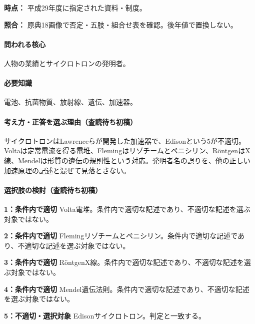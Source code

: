 \noindent\textbf{時点：} 平成29年度に指定された資料・制度。\par

\noindent\textbf{照合：} 原典18画像で否定・五肢・組合せ表を確認。後年値で置換しない。\par

\paragraph{問われる核心} 人物の業績とサイクロトロンの発明者。

\paragraph{必要知識} 電池、抗菌物質、放射線、遺伝、加速器。

\paragraph{考え方・正答を選ぶ理由（査読待ち初稿）} サイクロトロンはLawrenceらが開発した加速器で、Edisonという5が不適切。Voltaは定常電流を得る電堆、Flemingはリゾチームとペニシリン、RöntgenはX線、Mendelは形質の遺伝の規則性という対応。発明者名の誤りを、他の正しい加速原理の記述と混ぜて見落とさない。

\paragraph{選択肢の検討（査読待ち初稿）}\mbox{}\par

\noindent\textbf{1：条件内で適切} Volta電堆。条件内で適切な記述であり、不適切な記述を選ぶ対象ではない。\par

\noindent\textbf{2：条件内で適切} Flemingリゾチームとペニシリン。条件内で適切な記述であり、不適切な記述を選ぶ対象ではない。\par

\noindent\textbf{3：条件内で適切} RöntgenX線。条件内で適切な記述であり、不適切な記述を選ぶ対象ではない。\par

\noindent\textbf{4：条件内で適切} Mendel遺伝法則。条件内で適切な記述であり、不適切な記述を選ぶ対象ではない。\par

\noindent\textbf{5：不適切・選択対象} Edisonサイクロトロン。判定と一致する。\par

